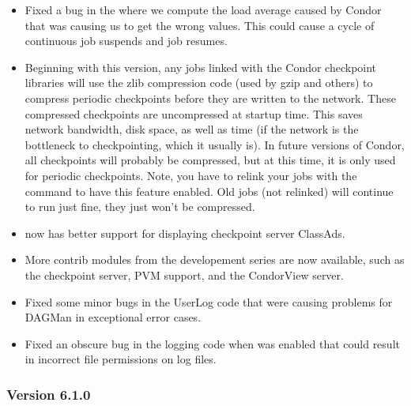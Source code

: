 \begin{itemize}

\item Fixed a bug in the  where we compute the load
average caused by Condor that was causing us to get the wrong values.
This could cause a cycle of continuous job suspends and job resumes.

\item Beginning with this version, any jobs linked with the Condor
checkpoint libraries will use the zlib compression code (used by gzip
and others) to compress periodic checkpoints before they are written
to the network.  
These compressed checkpoints are uncompressed at startup time.  
This saves network bandwidth, disk space, as well as time (if the
network is the bottleneck to checkpointing, which it usually is). 
In future versions of Condor, all checkpoints will probably be
compressed, but at this time, it is only used for periodic
checkpoints.  
Note, you have to relink your jobs with the  command
to have this feature enabled.
Old jobs (not relinked) will continue to run just fine, they just
won't be compressed.

\item {} now has better support for displaying checkpoint
server ClassAds. 

\item More contrib modules from the developement series are now
available, such as the checkpoint server, PVM support, and the
CondorView server.  

\item Fixed some minor bugs in the UserLog code that were causing
problems for DAGMan in exceptional error cases.

\item Fixed an obscure bug in the logging code when  was
enabled that could result in incorrect file permissions on log files. 

\end{itemize}

\subsubsection{\label{sec:New-6-1-0}Version 6.1.0}


